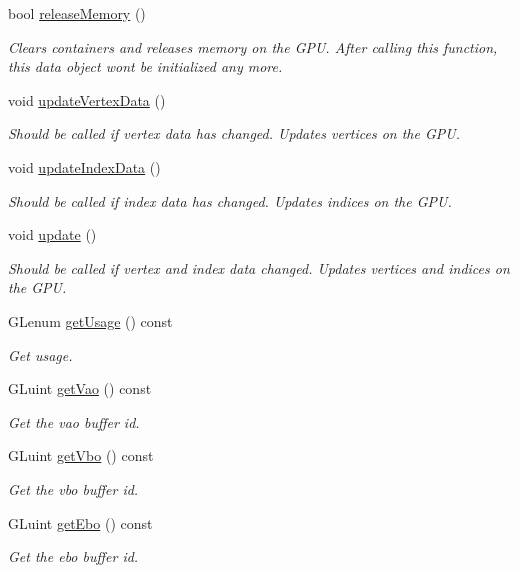 \begin{DoxyCompactItemize}
bool \mbox{\hyperlink{classec_1_1_geometry_data_a5df7921c489c60d96a971003c299dcb3}{release\+Memory}} ()
\begin{DoxyCompactList}\small\item\em Clears containers and releases memory on the G\+PU. After calling this function, this data object won\textquotesingle{}t be initialized any more. \end{DoxyCompactList}\item 
void \mbox{\hyperlink{classec_1_1_geometry_data_aeb93c2e5bd5f4656eaa12651cd4927aa}{update\+Vertex\+Data}} ()
\begin{DoxyCompactList}\small\item\em Should be called if vertex data has changed. Updates vertices on the G\+PU. \end{DoxyCompactList}\item 
void \mbox{\hyperlink{classec_1_1_geometry_data_a23fd4a2619691fb7bbd5c0650544cce3}{update\+Index\+Data}} ()
\begin{DoxyCompactList}\small\item\em Should be called if index data has changed. Updates indices on the G\+PU. \end{DoxyCompactList}\item 
void \mbox{\hyperlink{classec_1_1_geometry_data_ad8edfa8a7fda52850f072ab845ef38fd}{update}} ()
\begin{DoxyCompactList}\small\item\em Should be called if vertex and index data changed. Updates vertices and indices on the G\+PU. \end{DoxyCompactList}\item 
G\+Lenum \mbox{\hyperlink{classec_1_1_geometry_data_a237459076c98af454bfc3624eebedc81}{get\+Usage}} () const
\begin{DoxyCompactList}\small\item\em Get usage. \end{DoxyCompactList}\item 
G\+Luint \mbox{\hyperlink{classec_1_1_geometry_data_abc8d74fcacf693aad19683387adcfadf}{get\+Vao}} () const
\begin{DoxyCompactList}\small\item\em Get the vao buffer id. \end{DoxyCompactList}\item 
G\+Luint \mbox{\hyperlink{classec_1_1_geometry_data_a067f9cd54e35a1faff1c5011a542eed8}{get\+Vbo}} () const
\begin{DoxyCompactList}\small\item\em Get the vbo buffer id. \end{DoxyCompactList}\item 
G\+Luint \mbox{\hyperlink{classec_1_1_geometry_data_ae3f427f933c595b169bd10551d52abc3}{get\+Ebo}} () const
\begin{DoxyCompactList}\small\item\em Get the ebo buffer id. \end{DoxyCompactList}\end{DoxyCompactItemize}
